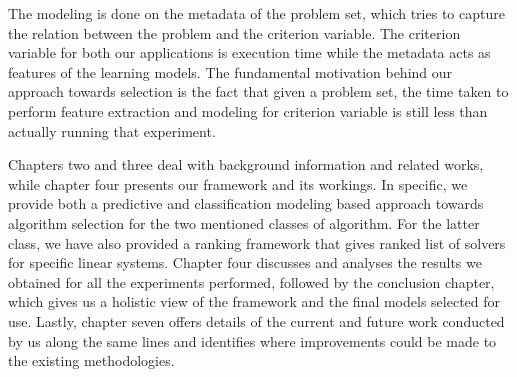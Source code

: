 The modeling is done on the metadata of the problem set, which tries to capture the relation between the problem and the criterion variable. The criterion variable for both our applications is execution time while the metadata acts as features of the learning models. The fundamental motivation behind our approach towards selection is the fact that given a problem set, the time taken to perform feature extraction and modeling for criterion variable is still less than actually running that experiment. 

Chapters two and three deal with background information and related works, while chapter four presents our framework and its workings. In specific, we provide both a predictive and classification modeling based approach towards algorithm selection for the two mentioned classes of algorithm. For the latter class, we have also provided a ranking framework that gives ranked list of solvers for specific linear systems. Chapter four discusses and analyses the results we obtained for all the experiments performed, followed by the conclusion chapter, which gives us a holistic view of the framework and the final models selected for use. Lastly, chapter seven offers details of the current and future work conducted by us along the same lines and identifies where improvements could be made to the existing methodologies.

